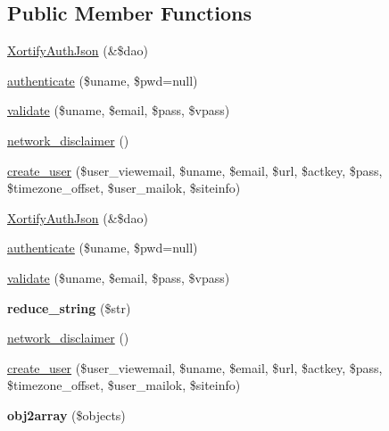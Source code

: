 \subsection*{Public Member Functions}
\begin{DoxyCompactItemize}
\item 
\hyperlink{class_xortify_auth_json_af9cea820589b04eda07f0170290d81ae}{Xortify\-Auth\-Json} (\&\$dao)
\item 
\hyperlink{class_xortify_auth_json_a00678ba307326b734e6c679f28bea315}{authenticate} (\$uname, \$pwd=null)
\item 
\hyperlink{class_xortify_auth_json_a91121a1b702dfd20fb65a027c8ed26ec}{validate} (\$uname, \$email, \$pass, \$vpass)
\item 
\hyperlink{class_xortify_auth_json_a1874c27b6f81a3f2ff9015405ad0f8bc}{network\-\_\-disclaimer} ()
\item 
\hyperlink{class_xortify_auth_json_ac72efc5ad313a592cf6706876f56f7ec}{create\-\_\-user} (\$user\-\_\-viewemail, \$uname, \$email, \$url, \$actkey, \$pass, \$timezone\-\_\-offset, \$user\-\_\-mailok, \$siteinfo)
\item 
\hyperlink{class_xortify_auth_json_af9cea820589b04eda07f0170290d81ae}{Xortify\-Auth\-Json} (\&\$dao)
\item 
\hyperlink{class_xortify_auth_json_a00678ba307326b734e6c679f28bea315}{authenticate} (\$uname, \$pwd=null)
\item 
\hyperlink{class_xortify_auth_json_a91121a1b702dfd20fb65a027c8ed26ec}{validate} (\$uname, \$email, \$pass, \$vpass)
\item 
\hypertarget{class_xortify_auth_json_ae463a3baa44e95fa5b5151ab2334df1c}{{\bfseries reduce\-\_\-string} (\$str)}\label{class_xortify_auth_json_ae463a3baa44e95fa5b5151ab2334df1c}

\item 
\hyperlink{class_xortify_auth_json_a1874c27b6f81a3f2ff9015405ad0f8bc}{network\-\_\-disclaimer} ()
\item 
\hyperlink{class_xortify_auth_json_ac72efc5ad313a592cf6706876f56f7ec}{create\-\_\-user} (\$user\-\_\-viewemail, \$uname, \$email, \$url, \$actkey, \$pass, \$timezone\-\_\-offset, \$user\-\_\-mailok, \$siteinfo)
\item 
\hypertarget{class_xortify_auth_json_aabc52e4f78557f0e0b360a8aaba6e11d}{{\bfseries obj2array} (\$objects)}\label{class_xortify_auth_json_aabc52e4f78557f0e0b360a8aaba6e11d}

\end{DoxyCompactItemize}
